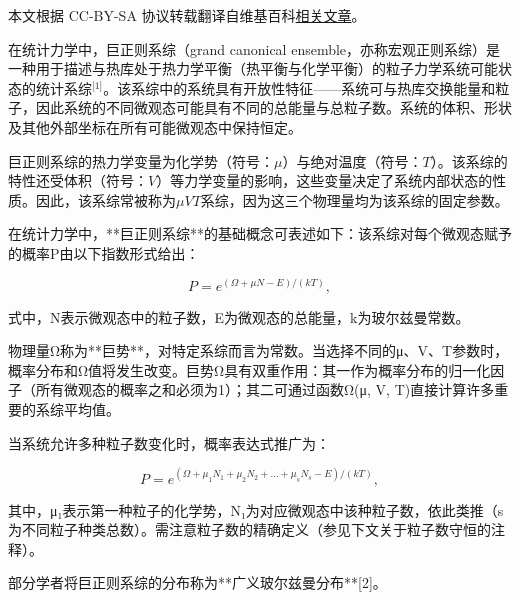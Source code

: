 
本文根据 CC-BY-SA 协议转载翻译自维基百科\href{https://en.wikipedia.org/wiki/Grand_canonical_ensemble}{相关文章}。

在统计力学中，巨正则系综（grand canonical ensemble，亦称宏观正则系综）是一种用于描述与热库处于热力学平衡（热平衡与化学平衡）的粒子力学系统可能状态的统计系综\(^\text{[1]}\)。该系综中的系统具有开放性特征——系统可与热库交换能量和粒子，因此系统的不同微观态可能具有不同的总能量与总粒子数。系统的体积、形状及其他外部坐标在所有可能微观态中保持恒定。

巨正则系综的热力学变量为化学势（符号：\(\mu\)）与绝对温度（符号：\(T\)）。该系综的特性还受体积（符号：\(V\)）等力学变量的影响，这些变量决定了系统内部状态的性质。因此，该系综常被称为\(\mu VT\)系综，因为这三个物理量均为该系综的固定参数。

在统计力学中，**巨正则系综**的基础概念可表述如下：该系综对每个微观态赋予的概率P由以下指数形式给出：

\[
P = e^{(\Omega + \mu N - E)/(kT)},
\]

式中，N表示微观态中的粒子数，E为微观态的总能量，k为玻尔兹曼常数。  

物理量Ω称为**巨势**，对特定系综而言为常数。当选择不同的μ、V、T参数时，概率分布和Ω值将发生改变。巨势Ω具有双重作用：其一作为概率分布的归一化因子（所有微观态的概率之和必须为1）；其二可通过函数Ω(μ, V, T)直接计算许多重要的系综平均值。  

当系统允许多种粒子数变化时，概率表达式推广为：  

\[
P = e^{(\Omega + \mu_1N_1 + \mu_2N_2 + \ldots + \mu_sN_s - E)/(kT)},
\]  

其中，μ₁表示第一种粒子的化学势，N₁为对应微观态中该种粒子数，依此类推（s为不同粒子种类总数）。需注意粒子数的精确定义（参见下文关于粒子数守恒的注释）。  

部分学者将巨正则系综的分布称为**广义玻尔兹曼分布**[2]。
